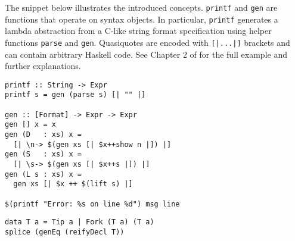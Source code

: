 \documentclass[10pt,journal,a4paper]{IEEEtran}
\begin{document}
The snippet below illustrates the introduced concepts. \small \texttt{printf} \normalsize and
\small \texttt{gen} \normalsize are functions that operate on syntax objects. In particular,
\small \texttt{printf} \normalsize generates a lambda abstraction from a C-like string format
specification using helper functions \small \texttt{parse} \normalsize and \small \texttt{gen}\normalsize.
Quasiquotes are encoded with \small \texttt{[|...|]} \normalsize brackets and can contain arbitrary
Haskell code. See Chapter 2 of \cite{sheard02} for the full example and further explanations.

\small
\begin{verbatim}
printf :: String -> Expr
printf s = gen (parse s) [| "" |]

gen :: [Format] -> Expr -> Expr
gen [] x = x
gen (D   : xs) x =
  [| \n-> $(gen xs [| $x++show n |]) |]
gen (S   : xs) x =
  [| \s-> $(gen xs [| $x++s |]) |]
gen (L s : xs) x =
  gen xs [| $x ++ $(lift s) |]

$(printf "Error: %s on line %d") msg line
\end{verbatim}
\normalsize

\lipsum[1]

\small
\begin{verbatim}
data T a = Tip a | Fork (T a) (T a)
splice (genEq (reifyDecl T))
\end{verbatim}
\normalsize
\end{document}
